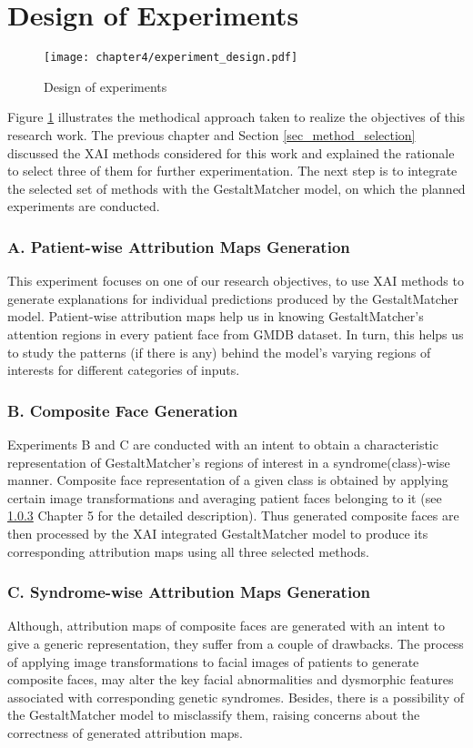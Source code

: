 \documentclass[../report.tex]{subfiles}
\begin{document}
    \section{Design of Experiments}\label{sec_exp_design}
    \begin{figure}[ht]
    	\hspace*{-0.5cm}      
       	\texttt{[image: chapter4/experiment\_design.pdf]}
        	\caption{Design of experiments}
    	    	\label{fig_exp_design}
    \end{figure}
    Figure \ref{fig_exp_design} illustrates the methodical approach taken to realize the objectives of this research work. The previous chapter and Section \ref{sec_method_selection} discussed the XAI methods considered for this work and explained the rationale to select three of them for further experimentation. The next step is to integrate the selected set of methods with the GestaltMatcher model, on which the planned experiments are conducted. 

    \subsubsection{A. Patient-wise Attribution Maps Generation}
    This experiment focuses on one of our research objectives, to use XAI methods to generate explanations for individual predictions produced by the GestaltMatcher model. 
    Patient-wise attribution maps help us in knowing GestaltMatcher's attention regions in every patient face from GMDB dataset. In turn, this helps us to study the patterns (if there is any) behind the model's varying regions of interests for different categories of inputs.
    \subsubsection{B. Composite Face Generation}
    Experiments B and C are conducted with an intent to obtain a characteristic representation of GestaltMatcher's regions of interest in a syndrome(class)-wise manner. Composite face representation of a given class is obtained by applying certain image transformations and averaging patient faces belonging to it (see \ref{} Chapter 5 for the detailed description). Thus generated composite faces are then processed by the XAI integrated GestaltMatcher model to produce its corresponding attribution maps using all three selected methods.
    \subsubsection{C. Syndrome-wise Attribution Maps Generation}
    Although, attribution maps of composite faces are generated with an intent to give a generic representation, they suffer from a couple of drawbacks. The process of applying image transformations to facial images of patients to generate composite faces, may alter the key facial abnormalities and dysmorphic features associated with corresponding genetic syndromes. Besides, there is a possibility of the GestaltMatcher model to misclassify them, raising concerns about the correctness of generated attribution maps. 
    
\end{document}

